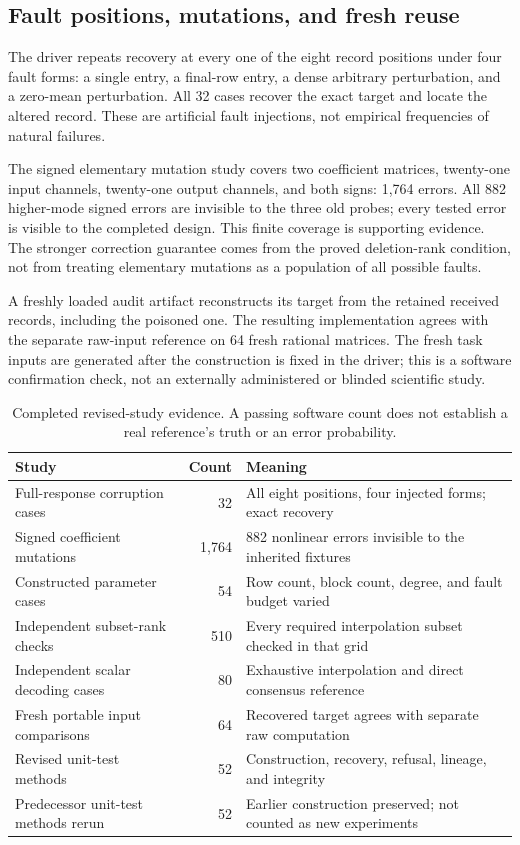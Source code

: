 \documentclass[11pt,letterpaper]{article}
\theoremstyle{remark}\newtheorem{remark}{Remark}[section]
\begin{document}
\subsection{Fault positions, mutations, and fresh reuse}
The driver repeats recovery at every one of the eight record positions under four fault forms: a single entry, a final-row entry, a dense arbitrary perturbation, and a zero-mean perturbation. All 32 cases recover the exact target and locate the altered record. These are artificial fault injections, not empirical frequencies of natural failures.

The signed elementary mutation study covers two coefficient matrices, twenty-one input channels, twenty-one output channels, and both signs: 1,764 errors. All 882 higher-mode signed errors are invisible to the three old probes; every tested error is visible to the completed design. This finite coverage is supporting evidence. The stronger correction guarantee comes from the proved deletion-rank condition, not from treating elementary mutations as a population of all possible faults.

A freshly loaded audit artifact reconstructs its target from the retained received records, including the poisoned one. The resulting implementation agrees with the separate raw-input reference on 64 fresh rational matrices. The fresh task inputs are generated after the construction is fixed in the driver; this is a software confirmation check, not an externally administered or blinded scientific study.

\begin{table}[htbp]\centering\small
\caption{Completed revised-study evidence. A passing software count does not establish a real reference's truth or an error probability.}\label{tab:results}
\begin{tabularx}{\linewidth}{@{}YrY@{}}\toprule
Study & Count & Meaning\\\midrule
Full-response corruption cases & 32 & All eight positions, four injected forms; exact recovery\\
Signed coefficient mutations & 1,764 & 882 nonlinear errors invisible to the inherited fixtures\\
Constructed parameter cases & 54 & Row count, block count, degree, and fault budget varied\\
Independent subset-rank checks & 510 & Every required interpolation subset checked in that grid\\
Independent scalar decoding cases & 80 & Exhaustive interpolation and direct consensus reference\\
Fresh portable input comparisons & 64 & Recovered target agrees with separate raw computation\\
Revised unit-test methods & 52 & Construction, recovery, refusal, lineage, and integrity\\
Predecessor unit-test methods rerun & 52 & Earlier construction preserved; not counted as new experiments\\\bottomrule
\end{tabularx}
\end{table}
\end{document}
